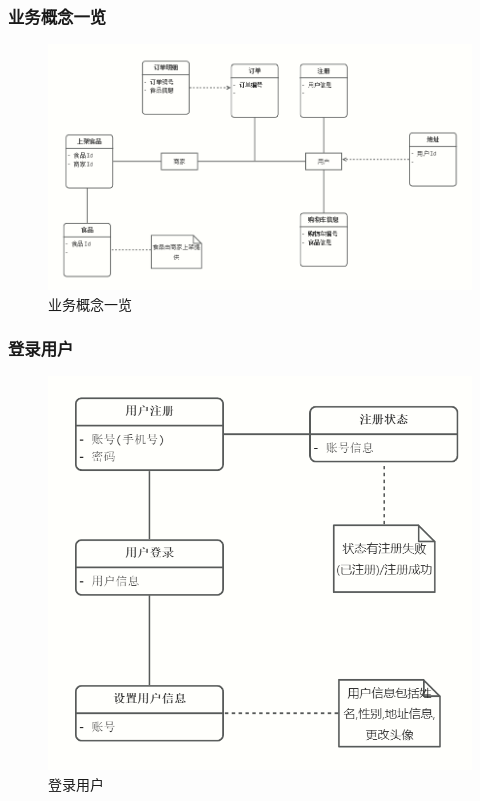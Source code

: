 \subsubsection{业务概念一览}
\begin{figure}[H]
    \centering
    \includegraphics[width=0.90\linewidth]{pics/1.png}
    \caption{业务概念一览}
    \label{fig:ywgn}
\end{figure}

\subsubsection{登录用户}

\begin{figure}[h]
    \centering
    \includegraphics[width=0.5\linewidth]{pics/2.png}
    \caption{登录用户}
    \label{fig:dlyh}
\end{figure}

